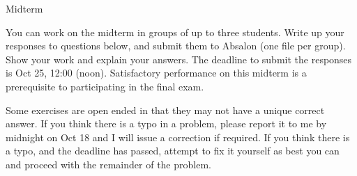 \documentclass{article}
\newif\ifsolutions
\begin{document}
\begin{center}
	{\Huge Midterm
	\ifsolutions (with Solutions) \fi}
\end{center}
\bigskip

\ifsolutions
The solutions below are meant to explain a possible way to solve the given problems. They are not meant to present an answer that would receive maximal grade for each question, and neither should they be understood as a grading rubric.
\else
You can work on the midterm in groups of up to three students. Write up your responses to questions below, and submit them to Absalon (one file per group). Show your work and explain your answers. The deadline to submit the responses is Oct 25, 12:00 (noon). Satisfactory performance on this midterm is a prerequisite to participating in the final exam.

Some exercises are open ended in that they may not have a unique correct answer. If you think there is a typo in a problem, please report it to me by midnight on Oct 18 and I will issue a correction if required. If you think there is a typo, and the deadline has passed, attempt to fix it yourself as best you can and proceed with the remainder of the problem. 
\fi
\end{document}
